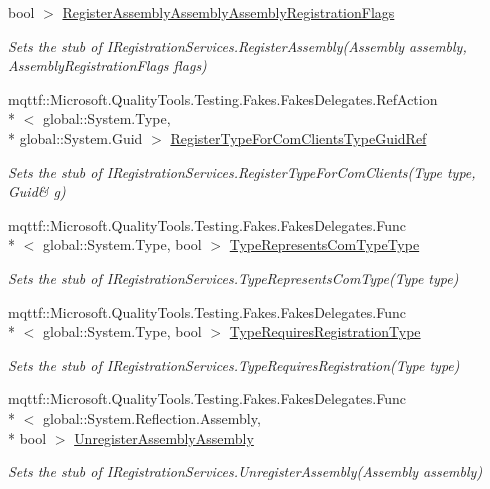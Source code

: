 \begin{DoxyCompactItemize}
bool $>$ \hyperlink{class_system_1_1_runtime_1_1_interop_services_1_1_fakes_1_1_stub_i_registration_services_a9736aeaf58abfa359b4ae1655cdc4b05}{Register\-Assembly\-Assembly\-Assembly\-Registration\-Flags}
\begin{DoxyCompactList}\small\item\em Sets the stub of I\-Registration\-Services.\-Register\-Assembly(\-Assembly assembly, Assembly\-Registration\-Flags flags)\end{DoxyCompactList}\item 
mqttf\-::\-Microsoft.\-Quality\-Tools.\-Testing.\-Fakes.\-Fakes\-Delegates.\-Ref\-Action\\*
$<$ global\-::\-System.\-Type, \\*
global\-::\-System.\-Guid $>$ \hyperlink{class_system_1_1_runtime_1_1_interop_services_1_1_fakes_1_1_stub_i_registration_services_a84c29e5f95541516c9ff9980a2939713}{Register\-Type\-For\-Com\-Clients\-Type\-Guid\-Ref}
\begin{DoxyCompactList}\small\item\em Sets the stub of I\-Registration\-Services.\-Register\-Type\-For\-Com\-Clients(Type type, Guid\& g)\end{DoxyCompactList}\item 
mqttf\-::\-Microsoft.\-Quality\-Tools.\-Testing.\-Fakes.\-Fakes\-Delegates.\-Func\\*
$<$ global\-::\-System.\-Type, bool $>$ \hyperlink{class_system_1_1_runtime_1_1_interop_services_1_1_fakes_1_1_stub_i_registration_services_a1443a4e4fbb68ca14aa5f364bed24328}{Type\-Represents\-Com\-Type\-Type}
\begin{DoxyCompactList}\small\item\em Sets the stub of I\-Registration\-Services.\-Type\-Represents\-Com\-Type(\-Type type)\end{DoxyCompactList}\item 
mqttf\-::\-Microsoft.\-Quality\-Tools.\-Testing.\-Fakes.\-Fakes\-Delegates.\-Func\\*
$<$ global\-::\-System.\-Type, bool $>$ \hyperlink{class_system_1_1_runtime_1_1_interop_services_1_1_fakes_1_1_stub_i_registration_services_aa9910d336f9fa29e7f40d3f847368ee3}{Type\-Requires\-Registration\-Type}
\begin{DoxyCompactList}\small\item\em Sets the stub of I\-Registration\-Services.\-Type\-Requires\-Registration(\-Type type)\end{DoxyCompactList}\item 
mqttf\-::\-Microsoft.\-Quality\-Tools.\-Testing.\-Fakes.\-Fakes\-Delegates.\-Func\\*
$<$ global\-::\-System.\-Reflection.\-Assembly, \\*
bool $>$ \hyperlink{class_system_1_1_runtime_1_1_interop_services_1_1_fakes_1_1_stub_i_registration_services_aef78ce6818fb8d488146112ddff75f91}{Unregister\-Assembly\-Assembly}
\begin{DoxyCompactList}\small\item\em Sets the stub of I\-Registration\-Services.\-Unregister\-Assembly(\-Assembly assembly)\end{DoxyCompactList}\end{DoxyCompactItemize}


